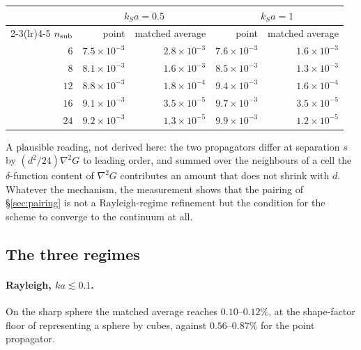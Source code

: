 \documentclass[11pt,a4paper]{article}
\begin{document}
\begin{center}
\begin{tabular}{@{}rrrrr@{}}
\toprule
 & \multicolumn{2}{c}{$k_Sa = 0.5$} & \multicolumn{2}{c}{$k_Sa = 1$}\\
\cmidrule(lr){2-3}\cmidrule(lr){4-5}
$n_{\rm sub}$ & point & matched average & point & matched average\\
\midrule
$6$  & $7.5\times10^{-3}$ & $2.8\times10^{-3}$ & $7.6\times10^{-3}$ & $1.6\times10^{-3}$\\
$8$  & $8.1\times10^{-3}$ & $1.6\times10^{-3}$ & $8.5\times10^{-3}$ & $1.3\times10^{-3}$\\
$12$ & $8.8\times10^{-3}$ & $1.8\times10^{-4}$ & $9.4\times10^{-3}$ & $1.6\times10^{-4}$\\
$16$ & $9.1\times10^{-3}$ & $3.5\times10^{-5}$ & $9.7\times10^{-3}$ & $3.5\times10^{-5}$\\
$24$ & $9.2\times10^{-3}$ & $1.3\times10^{-5}$ & $9.9\times10^{-3}$ & $1.2\times10^{-5}$\\
\bottomrule
\end{tabular}
\end{center}

\noindent
A plausible reading, not derived here: the two propagators differ at separation
$s$ by $(d^2/24)\nabla^2 G$ to leading order, and summed over the neighbours of a
cell the $\delta$-function content of $\nabla^2 G$ contributes an amount that does
not shrink with $d$.  Whatever the mechanism, the measurement shows that the
pairing of \S\ref{sec:pairing} is not a Rayleigh-regime refinement but the
condition for the scheme to converge to the continuum at all.

\subsection{The three regimes}

\paragraph{Rayleigh, $ka\lesssim0.1$.}  On the sharp sphere the matched average
reaches $0.10$--$0.12\%$, at the shape-factor floor of representing a sphere by
cubes, against $0.56$--$0.87\%$ for the point propagator.
\end{document}
